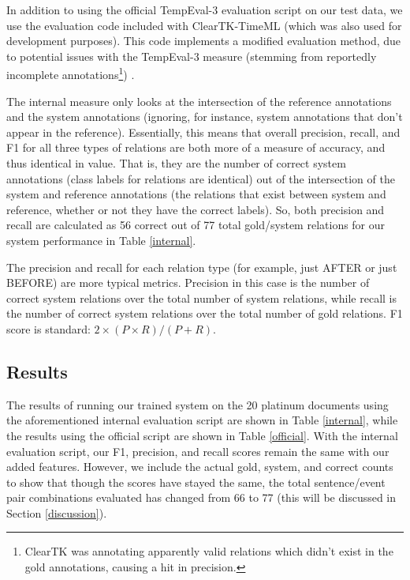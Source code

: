 \documentclass[11pt]{article}
\begin{document}
In addition to using the official TempEval-3 evaluation script on our test data, we use the evaluation code included with ClearTK-TimeML (which was also used for development purposes). This code implements a modified evaluation method, due to potential issues with the TempEval-3 measure (stemming from reportedly incomplete annotations\footnote{ClearTK was annotating apparently valid relations which didn't exist in the gold annotations, causing a hit in precision.}) \cite{Bethard:13}.

The internal measure only looks at the intersection of the reference annotations and the system annotations (ignoring, for instance, system annotations that don't appear in the reference). Essentially, this means that overall precision, recall, and F1 for all three types of relations are both more of a measure of accuracy, and thus identical in value. That is, they are the number of correct system annotations (class labels for relations are identical) out of the intersection of the system and reference annotations (the relations that exist between system and reference, whether or not they have the correct labels). So, both precision and recall are calculated as 56 correct out of 77 total gold/system relations for our system performance in Table \ref{internal}.

The precision and recall for each relation type (for example, just AFTER or just BEFORE) are more typical metrics. Precision in this case is the number of correct system relations over the total number of system relations, while recall is the number of correct system relations over the total number of gold relations. F1 score is standard: $2 \times (P \times R)/(P + R)$.


\subsection{Results}

The results of running our trained system on the 20 platinum documents using the aforementioned internal evaluation script are shown in Table \ref{internal}, while the results using the official script are shown in Table \ref{official}. With the internal evaluation script, our F1, precision, and recall scores remain the same with our added features. However, we include the actual gold, system, and correct counts to show that though the scores have stayed the same, the total sentence/event pair combinations evaluated has changed from 66 to 77 (this will be discussed in Section \ref{discussion}).
\end{document}
